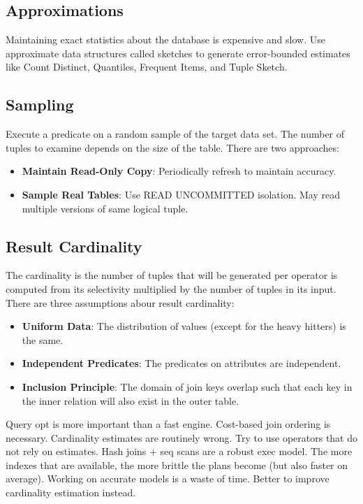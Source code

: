 \documentclass[11pt]{article}
\begin{document}
\subsection*{Approximations}
Maintaining exact statistics about the database is expensive and slow. Use approximate data structures called sketches
to generate error-bounded estimates like Count Distinct, Quantiles, Frequent Items, and Tuple Sketch.

\subsection*{Sampling}
Execute a predicate on a random sample of the target data set. The number of tuples to examine depends on the size of the table. There are two approaches:
\begin{itemize}
	\item \textbf{Maintain Read-Only Copy}:
	Periodically refresh to maintain accuracy.
	
	\item \textbf{Sample Real Tables}:
	Use READ UNCOMMITTED isolation.
	May read multiple versions of same logical tuple.
\end{itemize}

\subsection*{Result Cardinality}
The cardinality is the number of tuples that will be generated per operator is computed from its selectivity multiplied by the number of tuples in its input. There are three assumptions abour result cardinality:
\begin{itemize}
	\item \textbf{Uniform Data}:
	The distribution of values (except for the heavy hitters) is the same.
	
	\item \textbf{Independent Predicates}:
	The predicates on attributes are independent.
	
	\item \textbf{Inclusion Principle}:
	The domain of join keys overlap such that each key in the inner relation will also exist in the outer table.
\end{itemize}


Query opt is more important than a fast engine. Cost-based join ordering is necessary.
Cardinality estimates are routinely wrong. Try to use operators that do not rely on estimates.
Hash joins + seq scans are a robust exec model. The more indexes that are available, the more brittle the plans become (but also faster on average).
Working on accurate models is a waste of time. Better to improve cardinality estimation instead. 
\newpage


\end{document}
